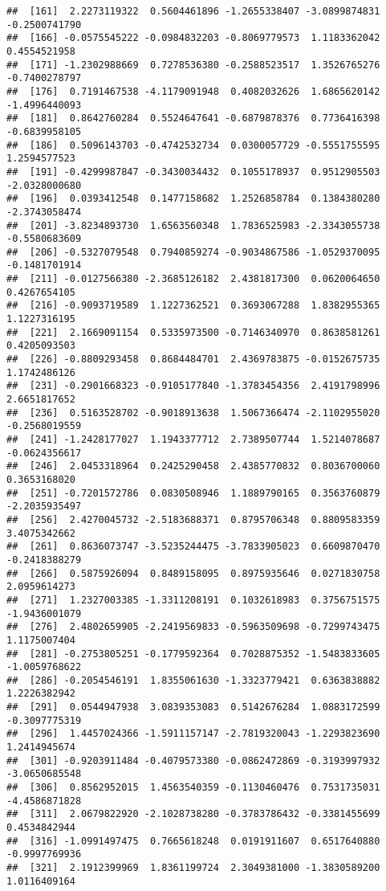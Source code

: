 \documentclass[
]{article}
\begin{document}
\begin{verbatim}
##  [161]  2.2273119322  0.5604461896 -1.2655338407 -3.0899874831 -0.2500741790
##  [166] -0.0575545222 -0.0984832203 -0.8069779573  1.1183362042  0.4554521958
##  [171] -1.2302988669  0.7278536380 -0.2588523517  1.3526765276 -0.7400278797
##  [176]  0.7191467538 -4.1179091948  0.4082032626  1.6865620142 -1.4996440093
##  [181]  0.8642760284  0.5524647641 -0.6879878376  0.7736416398 -0.6839958105
##  [186]  0.5096143703 -0.4742532734  0.0300057729 -0.5551755595  1.2594577523
##  [191] -0.4299987847 -0.3430034432  0.1055178937  0.9512905503 -2.0328000680
##  [196]  0.0393412548  0.1477158682  1.2526858784  0.1384380280 -2.3743058474
##  [201] -3.8234893730  1.6563560348  1.7836525983 -2.3343055738 -0.5580683609
##  [206] -0.5327079548  0.7940859274 -0.9034867586 -1.0529370095 -0.1481701914
##  [211] -0.0127566380 -2.3685126182  2.4381817300  0.0620064650  0.4267654105
##  [216] -0.9093719589  1.1227362521  0.3693067288  1.8382955365  1.1227316195
##  [221]  2.1669091154  0.5335973500 -0.7146340970  0.8638581261  0.4205093503
##  [226] -0.8809293458  0.8684484701  2.4369783875 -0.0152675735  1.1742486126
##  [231] -0.2901668323 -0.9105177840 -1.3783454356  2.4191798996  2.6651817652
##  [236]  0.5163528702 -0.9018913638  1.5067366474 -2.1102955020 -0.2568019559
##  [241] -1.2428177027  1.1943377712  2.7389507744  1.5214078687 -0.0624356617
##  [246]  2.0453318964  0.2425290458  2.4385770832  0.8036700060  0.3653168020
##  [251] -0.7201572786  0.0830508946  1.1889790165  0.3563760879 -2.2035935497
##  [256]  2.4270045732 -2.5183688371  0.8795706348  0.8809583359  3.4075342662
##  [261]  0.8636073747 -3.5235244475 -3.7833905023  0.6609870470 -0.2418388279
##  [266]  0.5875926094  0.8489158095  0.8975935646  0.0271830758  2.0959614273
##  [271]  1.2327003385 -1.3311208191  0.1032618983  0.3756751575 -1.9436001079
##  [276]  2.4802659905 -2.2419569833 -0.5963509698 -0.7299743475  1.1175007404
##  [281] -0.2753805251 -0.1779592364  0.7028875352 -1.5483833605 -1.0059768622
##  [286] -0.2054546191  1.8355061630 -1.3323779421  0.6363838882  1.2226382942
##  [291]  0.0544947938  3.0839353083  0.5142676284  1.0883172599 -0.3097775319
##  [296]  1.4457024366 -1.5911157147 -2.7819320043 -1.2293823690  1.2414945674
##  [301] -0.9203911484 -0.4079573380 -0.0862472869 -0.3193997932 -3.0650685548
##  [306]  0.8562952015  1.4563540359 -0.1130460476  0.7531735031 -4.4586871828
##  [311]  2.0679822920 -2.1028738280 -0.3783786432 -0.3381455699  0.4534842944
##  [316] -1.0991497475  0.7665618248  0.0191911607  0.6517640880 -0.9997769936
##  [321]  2.1912399969  1.8361199724  2.3049381000 -1.3830589200  1.0116409164

\end{verbatim}
\end{document}
